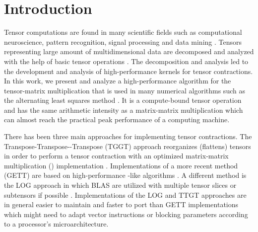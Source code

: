 \section{Introduction}
\label{sec:introduction}
Tensor computations are found in many scientific fields such as computational neuroscience, pattern recognition, signal processing and data mining \cite{karahan:2015:tensor, papalexakis:2017:tensors}.
Tensors representing large amount of multidimensional data are decomposed and analyzed with the help of basic tensor operations \cite{lee:2018:fundamental, kolda:2009:decompositions}. 
The decomposition and analysis led to the development and analysis of high-performance kernels for tensor contractions.
In this work, we present and analyze a high-performance algorithm for the tensor-matrix multiplication that is used in many numerical algorithms such as the alternating least squares method \cite{lee:2018:fundamental, kolda:2009:decompositions}.
It is a compute-bound tensor operation and has the same arithmetic intensity as a matrix-matrix multiplication which can almost reach the practical peak performance of a computing machine.

There has been three main approaches for implementing tensor contractions.
The Transpose-Transpose--Transpose (TGGT) approach reorganizes (flattens) tensors in order to perform a tensor contraction with an optimized matrix-matrix multiplication () implementation \cite{bader:2006:algorithm862, solomonik:2013:cyclops}.
Implementations of a more recent method (GETT) are based on high-performance -like algorithms \cite{springer:2018:design, matthews:2018:high}.
A different method is the LOG approach in which BLAS are utilized with multiple tensor slices or subtensors if possible \cite{dinapoli:2014:towards.efficient.use, li:2015:input, shi:2016:tensor.contraction}.
Implementations of the LOG and TTGT approaches are in general easier to maintain and faster to port than GETT implementations which might need to adapt vector instructions or blocking parameters according to a processor's microarchitecture.

